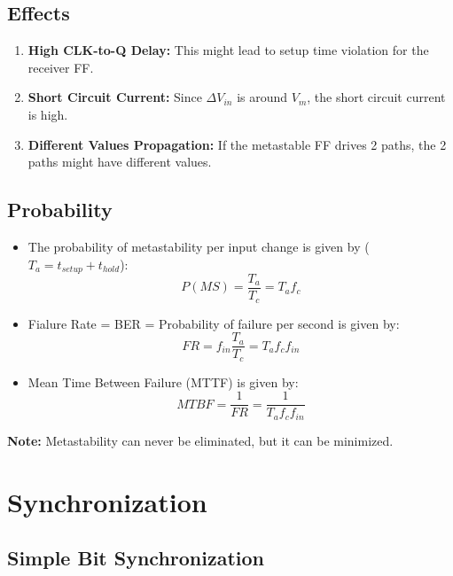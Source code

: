 \documentclass[11pt]{article}
\begin{document}
\subsection*{Effects}
\begin{enumerate}
    \item \textbf{High CLK-to-Q Delay:} This might lead to setup time violation for the receiver FF.
    \item \textbf{Short Circuit Current:} Since $\Delta V_{in}$ is around $V_m$, the short circuit current is high.
    \item \textbf{Different Values Propagation:} If the metastable FF drives 2 paths, the 2 paths might have different values.
\end{enumerate}

\subsection*{Probability}
\begin{itemize}
    \item The probability of metastability per input change is given by ($T_a=t_{setup}+t_{hold}$): 
    \begin{equation*}
        P(MS)=\frac{T_a}{T_c}=T_af_c
    \end{equation*}
    \item Fialure Rate = BER = Probability of failure per second is given by:
    \begin{equation*}
        FR = f_{in}\frac{T_a}{T_c}=T_af_cf_{in}
    \end{equation*}
    \item Mean Time Between Failure (MTTF) is given by:
    \begin{equation*}
        MTBF = \frac{1}{FR} = \frac{1}{T_af_cf_{in}}
    \end{equation*}
\end{itemize}
\textbf{Note:} Metastability can never be eliminated, but it can be minimized.
\pagebreak

\section*{Synchronization}

\subsection*{Simple Bit Synchronization}
\end{document}
